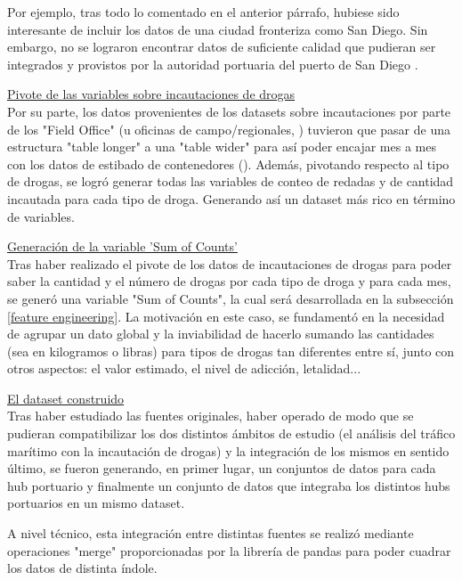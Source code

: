 \documentclass[12pt]{article}
\begin{document}
		Por ejemplo, tras todo lo comentado en el anterior párrafo, hubiese sido interesante de incluir los datos de una ciudad fronteriza como San Diego. Sin embargo, no se lograron encontrar datos de suficiente calidad que pudieran ser integrados y provistos por la autoridad portuaria del puerto de San Diego \cite{portofsandiego2025}.
		
		
		\underline{Pivote de las variables sobre incautaciones de drogas}\\
		Por su parte, los datos provenientes de los datasets sobre incautaciones por parte de los "Field Office" (u oficinas de campo/regionales, \cite{cbp2025drugseizures}) tuvieron que pasar de una estructura "table longer" a una "table wider" para así poder encajar mes a mes con los datos de estibado de contenedores (\cite{cbp2022drugseizures}). Además, pivotando respecto al tipo de drogas, se logró generar todas las variables de conteo de redadas y de cantidad incautada para cada tipo de droga. Generando así un dataset más rico en término de variables.
		
		\underline{Generación de la variable 'Sum of Counts'}\\
		Tras haber realizado el pivote de los datos de incautaciones de drogas para poder saber la cantidad y el número de drogas por cada tipo de droga y para cada mes, se generó una variable "Sum of Counts", la cual será desarrollada en la subsección \ref{feature engineering}. La motivación en este caso, se fundamentó en la necesidad de agrupar un dato global y la inviabilidad de hacerlo sumando las cantidades (sea en kilogramos o libras) para tipos de drogas tan diferentes entre sí, junto con otros aspectos: el valor estimado, el nivel de adicción, letalidad...
		 
		\underline{El dataset construido}\\
		Tras haber estudiado las fuentes originales, haber operado de modo que se pudieran compatibilizar los dos distintos ámbitos de estudio (el análisis del tráfico marítimo con la incautación de drogas) y la integración de los mismos en sentido último, se fueron generando, en primer lugar, un conjuntos de datos para cada hub portuario y finalmente un conjunto de datos que integraba los distintos hubs portuarios en un mismo dataset.\cite{} 
		
		
		A nivel técnico, esta integración entre distintas fuentes se realizó mediante operaciones "merge" proporcionadas por la librería de pandas para poder cuadrar los datos de distinta índole.
		
\end{document}
